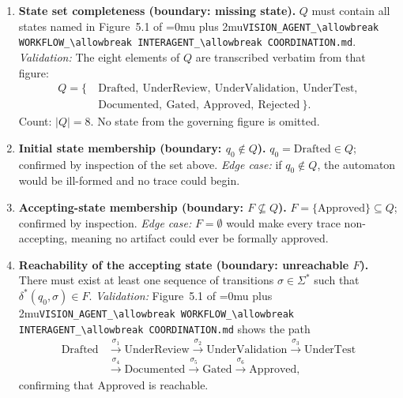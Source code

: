 \documentclass[12pt]{article}
\theoremstyle{definition}
\DeclareRobustCommand{\code}[1]{\begingroup\Urlmuskip=0mu plus 2mu\relax\nolinkurl{#1}\endgroup}
\newcommand{\VisionFlow}{\code{VISION\_AGENT\_\allowbreak WORKFLOW\_\allowbreak INTERAGENT\_\allowbreak COORDINATION.md}}
\begin{document}
\begin{enumerate}[label=\textbf{S\arabic*.}, leftmargin=*, widest=S9]

  \item \textbf{State set completeness (boundary: missing state).}
        $Q$ must contain all states named in Figure~5.1 of
        \VisionFlow{}.
        \emph{Validation:} The eight elements of $Q$ are transcribed
        verbatim from that figure:
        \begin{align*}
          Q = \{\ &\mathrm{Drafted},\ \mathrm{UnderReview},\
                   \mathrm{UnderValidation},\ \mathrm{UnderTest}, \\
                  &\mathrm{Documented},\ \mathrm{Gated},\
                   \mathrm{Approved},\ \mathrm{Rejected}\ \}.
        \end{align*}
        Count: $|Q| = 8$.  No state from the governing figure is
        omitted.

  \item \textbf{Initial state membership (boundary: $q_0 \notin Q$).}
        $q_0 = \mathrm{Drafted} \in Q$; confirmed by inspection of
        the set above.
        \emph{Edge case:} if $q_0 \notin Q$, the automaton would be
        ill-formed and no trace could begin.

  \item \textbf{Accepting-state membership (boundary: $F \not\subseteq
        Q$).}
        $F = \{\mathrm{Approved}\} \subseteq Q$; confirmed by
        inspection.
        \emph{Edge case:} $F = \emptyset$ would make every trace
        non-accepting, meaning no artifact could ever be formally
        approved.

  \item \textbf{Reachability of the accepting state (boundary:
        unreachable $F$).}
        There must exist at least one sequence of transitions
        $\sigma \in \Sigma^{*}$ such that
        $\delta^{*}(q_0, \sigma) \in F$.
        \emph{Validation:} Figure~5.1 of \VisionFlow{} shows the
        path
        \begin{align*}
          \mathrm{Drafted}
            &\xrightarrow{\,\sigma_1\,} \mathrm{UnderReview}
             \xrightarrow{\,\sigma_2\,} \mathrm{UnderValidation}
             \xrightarrow{\,\sigma_3\,} \mathrm{UnderTest} \\
            &\xrightarrow{\,\sigma_4\,} \mathrm{Documented}
             \xrightarrow{\,\sigma_5\,} \mathrm{Gated}
             \xrightarrow{\,\sigma_6\,} \mathrm{Approved},
        \end{align*}
        confirming that $\mathrm{Approved}$ is reachable.


\end{enumerate}
\end{document}
